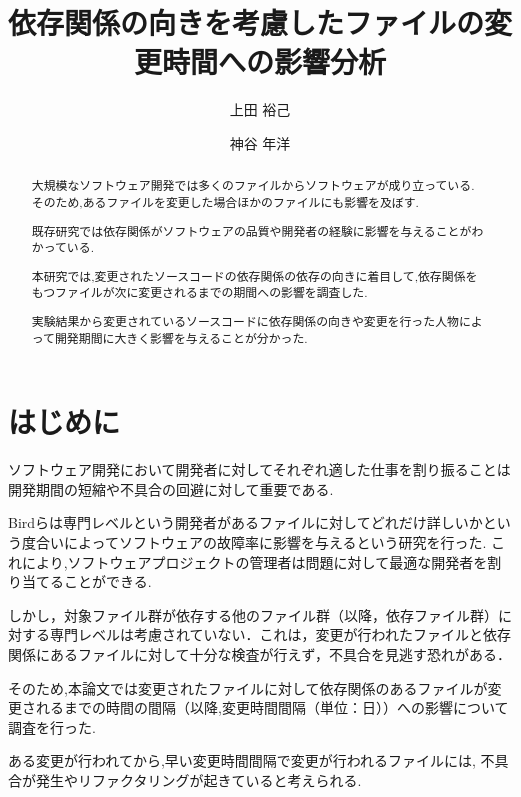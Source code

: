 \documentclass{fose2016}           %
\title{依存関係の向きを考慮したファイルの変更時間への影響分析}
\author{上田 裕己}{Ueda Yuki, 島根大学}
\author{神谷 年洋}{Kamiya Toshihiro, 島根大学}
\begin{document}
\maketitle

\begin{abstract}
大規模なソフトウェア開発では多くのファイルからソフトウェアが成り立っている.
そのため,あるファイルを変更した場合ほかのファイルにも影響を及ぼす.

既存研究では依存関係がソフトウェアの品質や開発者の経験に影響を与えることがわかっている.

本研究では,変更されたソースコードの依存関係の依存の向きに着目して,依存関係をもつファイルが次に変更されるまでの期間への影響を調査した.
 
実験結果から変更されているソースコードに依存関係の向きや変更を行った人物によって開発期間に大きく影響を与えることが分かった.
  

\end{abstract}

\begin{eabstract}

\end{eabstract}

\section{はじめに} 
ソフトウェア開発において開発者に対してそれぞれ適した仕事を割り振ることは開発期間の短縮や不具合の回避に対して重要である.

Bird\cite{Bird}らは専門レベルという開発者があるファイルに対してどれだけ詳しいかという度合いによってソフトウェアの故障率に影響を与えるという研究を行った.
これにより,ソフトウェアプロジェクトの管理者は問題に対して最適な開発者を割り当てることができる.

しかし，対象ファイル群が依存する他のファイル群（以降，依存ファイル群）に対する専門レベルは考慮されていない．これは，変更が行われたファイルと依存関係にあるファイルに対して十分な検査が行えず，不具合を見逃す恐れがある．


そのため,本論文では変更されたファイルに対して依存関係のあるファイルが変更されるまでの時間の間隔（以降,変更時間間隔（単位：日））への影響について調査を行った.

ある変更が行われてから,早い変更時間間隔で変更が行われるファイルには, 不具合が発生やリファクタリングが起きていると考えられる.%
\end{document}
